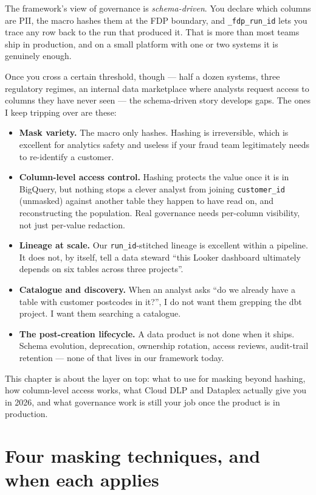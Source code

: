 \documentclass[
  11pt,
  british,
  oneside]{book}
\providecommand{\tightlist}{%
  \setlength{\itemsep}{0pt}\setlength{\parskip}{0pt}}
\begin{document}
The framework's view of governance is \emph{schema-driven}. You declare
which columns are PII, the macro hashes them at the FDP boundary, and
\texttt{\_fdp\_run\_id} lets you trace any row back to the run that
produced it. That is more than most teams ship in production, and on a
small platform with one or two systems it is genuinely enough.

Once you cross a certain threshold, though --- half a dozen systems,
three regulatory regimes, an internal data marketplace where analysts
request access to columns they have never seen --- the schema-driven
story develops gaps. The ones I keep tripping over are
these:

\begin{itemize}
\tightlist
\item
  \textbf{Mask variety.} The macro only hashes. Hashing is irreversible,
  which is excellent for analytics safety and useless if your fraud team
  legitimately needs to re-identify a customer.
\item
  \textbf{Column-level access control.} Hashing protects the value once
  it is in BigQuery, but nothing stops a clever analyst from joining
  \texttt{customer\_id} (unmasked) against another table they happen to
  have read on, and reconstructing the population. Real governance needs
  per-column visibility, not just per-value redaction.
\item
  \textbf{Lineage at scale.} Our \texttt{run\_id}-stitched lineage is
  excellent within a pipeline. It does not, by itself, tell a data
  steward ``this Looker dashboard ultimately depends on six tables
  across three projects''.
\item
  \textbf{Catalogue and discovery.} When an analyst asks ``do we already
  have a table with customer postcodes in it?'', I do not want them
  grepping the dbt project. I want them searching a catalogue.
\item
  \textbf{The post-creation lifecycle.} A data product is not done when
  it ships. Schema evolution, deprecation, ownership rotation, access
  reviews, audit-trail retention --- none of that lives in our framework
  today.
\end{itemize}

This chapter is about the layer on top: what to use for masking beyond
hashing, how column-level access works, what Cloud DLP and Dataplex
actually give you in 2026, and what governance work is still your job
once the product is in production.

\hypertarget{four-masking-techniques-and-when-each-applies}{%
\section{Four masking techniques, and when each
applies}\label{four-masking-techniques-and-when-each-applies}}
\end{document}
